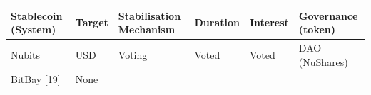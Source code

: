 \documentclass[english,]{IEEEtran}
\begin{document}
\begin{longtable}[]{@{}llllll@{}}
\toprule
\begin{minipage}[b]{0.27\columnwidth}\raggedright\strut
Stablecoin (System)\strut
\end{minipage} & \begin{minipage}[b]{0.06\columnwidth}\raggedright\strut
Target\strut
\end{minipage} & \begin{minipage}[b]{0.19\columnwidth}\raggedright\strut
Stabilisation Mechanism\strut
\end{minipage} & \begin{minipage}[b]{0.09\columnwidth}\raggedright\strut
Duration\strut
\end{minipage} & \begin{minipage}[b]{0.08\columnwidth}\raggedright\strut
Interest\strut
\end{minipage} & \begin{minipage}[b]{0.15\columnwidth}\raggedright\strut
Governance (token)\strut
\end{minipage}\tabularnewline
\midrule
\endhead
\begin{minipage}[t]{0.27\columnwidth}\raggedright\strut
Nubits\strut
\end{minipage} & \begin{minipage}[t]{0.06\columnwidth}\raggedright\strut
USD\strut
\end{minipage} & \begin{minipage}[t]{0.19\columnwidth}\raggedright\strut
Voting\strut
\end{minipage} & \begin{minipage}[t]{0.09\columnwidth}\raggedright\strut
Voted\strut
\end{minipage} & \begin{minipage}[t]{0.08\columnwidth}\raggedright\strut
Voted\strut
\end{minipage} & \begin{minipage}[t]{0.15\columnwidth}\raggedright\strut
DAO (NuShares)\strut
\end{minipage}\tabularnewline
\begin{minipage}[t]{0.27\columnwidth}\raggedright\strut
BitBay {[}19{]}\strut
\end{minipage} & \begin{minipage}[t]{0.06\columnwidth}\raggedright\strut
None\strut
\end{minipage} & \begin{minipage}[t]{0.19\columnwidth}\raggedright\strut

\end{minipage}
\end{longtable}
\end{document}
